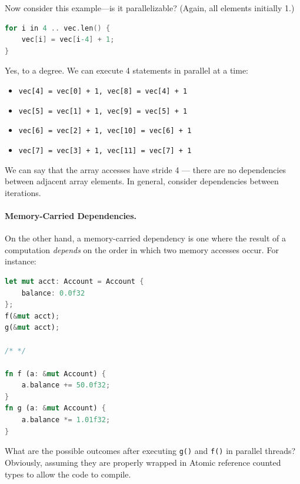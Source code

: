 \documentclass[a4paper]{report}
\begin{document}
 Now consider this example---is it parallelizable? (Again, all elements initially 1.)

\begin{lstlisting}[language=C]
for i in 4 .. vec.len() {
    vec[i] = vec[i-4] + 1;
}
\end{lstlisting}

Yes, to a degree. We can execute 4 statements in parallel at a time:
\begin{itemize}
  \item \texttt{vec[4] = vec[0] + 1, vec[8] = vec[4] + 1}
  \item \texttt{vec[5] = vec[1] + 1, vec[9] = vec[5] + 1}
  \item \texttt{vec[6] = vec[2] + 1, vec[10] = vec[6] + 1}
  \item \texttt{vec[7] = vec[3] + 1, vec[11] = vec[7] + 1}
\end{itemize}  
We can say that the array accesses have stride 4 --- there are no
dependencies between adjacent array elements. In general, consider
dependencies between iterations.


\paragraph{Memory-Carried Dependencies.} On the other hand, a memory-carried dependency is one where the result
of a computation \emph{depends} on the order in which two memory accesses
occur. For instance:

{\small \begin{lstlisting}[language=Rust]
let mut acct: Account = Account {
    balance: 0.0f32
};
f(&mut acct);
g(&mut acct);

/* */

fn f (a: &mut Account) {
    a.balance += 50.0f32;
}
fn g (a: &mut Account) {
    a.balance *= 1.01f32;
}
\end{lstlisting} }

{\sf What are the possible outcomes after executing {\tt g()} and {\tt f()}
in parallel threads? Obviously, assuming they are properly wrapped in Atomic reference counted types to allow the code to compile.} \\[1em]
\end{document}
